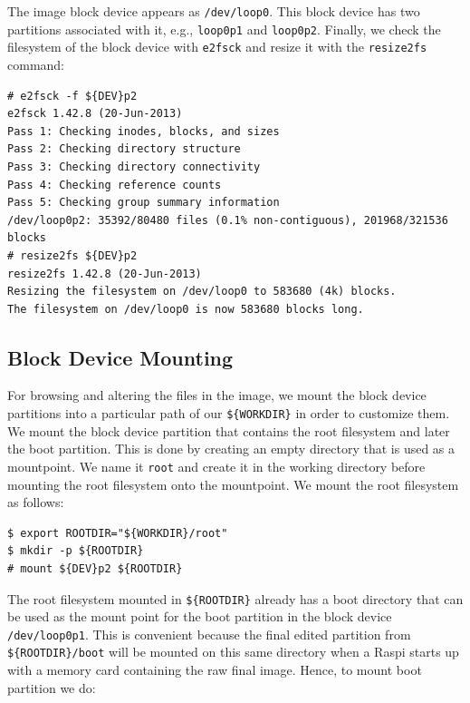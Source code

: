 \documentclass[electronics,article,accept,moreauthors,pdftex,10pt,a4paper]{mdpi}
\theoremstyle{mdpi}
\newcounter{ex}
\newcounter{re}
\theoremstyle{mdpidefinition}
\begin{document}
The image block device appears as \texttt{/dev/loop0}. This block device has
two partitions associated with it, e.g., \texttt{loop0p1} and \texttt{loop0p2}.
Finally, we check the filesystem of the block device with \texttt{e2fsck} and
resize it with the \texttt{resize2fs} command:%
\newpage
\begin{lstlisting}[]
# e2fsck -f ${DEV}p2
e2fsck 1.42.8 (20-Jun-2013)
Pass 1: Checking inodes, blocks, and sizes
Pass 2: Checking directory structure
Pass 3: Checking directory connectivity
Pass 4: Checking reference counts
Pass 5: Checking group summary information
/dev/loop0p2: 35392/80480 files (0.1% non-contiguous), 201968/321536 blocks
# resize2fs ${DEV}p2
resize2fs 1.42.8 (20-Jun-2013)
Resizing the filesystem on /dev/loop0 to 583680 (4k) blocks.
The filesystem on /dev/loop0 is now 583680 blocks long.
\end{lstlisting}
\FloatBarrier

\subsection{Block Device Mounting}
For browsing and altering the files in the image, we mount the block
device partitions into a particular path of our \texttt{\$\{WORKDIR\}} in order
to customize them. We mount the block device partition that
contains the root filesystem and later the boot partition. This is done by
creating an empty directory that is used as a mountpoint. We name it
\texttt{root} and create it in the working directory before mounting the
root filesystem onto the mountpoint. We mount the root filesystem
as follows:

\begin{lstlisting}[]
$ export ROOTDIR="${WORKDIR}/root"
$ mkdir -p ${ROOTDIR}
# mount ${DEV}p2 ${ROOTDIR}
\end{lstlisting}
\FloatBarrier
\vspace{-5mm}

The root filesystem mounted in \texttt{\$\{ROOTDIR\}} already has a boot
directory that can be used as the mount point for the boot partition
in the block device \texttt{/dev/loop0p1}. This is convenient because
the final edited partition from \texttt{\$\{ROOTDIR\}/boot} will be mounted on
this same directory when a Raspi starts up with a memory card
containing the raw final image. Hence, to mount boot partition we do:
\end{document}

